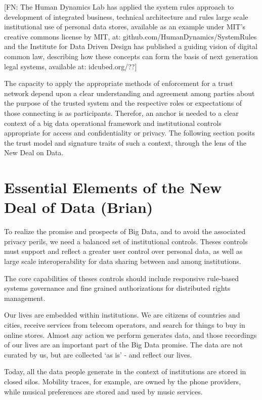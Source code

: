 [FN: The Human Dynamics Lab has applied the system rules approach to development of integrated business, technical architecture and rules large scale institutional use of personal data stores, available as an example under MIT's creative commons license by MIT, at: github.com/HumanDynamics/SystemRules and the Institute for Data Driven Design has published a guiding vision of digital common law, describing how these concepts can form the basis of next generation legal systems, available at: idcubed.org/??]

The capacity to apply the appropriate methods of enforcement for a trust network depend upon a clear understanding and agreement among parties about the purpose of the trusted system and the respective roles or expectations of those connecting is as participants.
Therefor, an anchor is needed to a clear context of a big data operational framework and institutional controls appropriate for access and confidentiality or privacy.
The following section posits the trust model and signature traits of such a context, through the lens of the New Deal on Data.

\section{Essential Elements of the New Deal of Data (Brian)}

To realize the promise and prospects of Big Data, and to avoid the associated privacy perils, we need a balanced set of institutional controls.
Theses controls must support and reflect a greater user control over personal data, as well as large scale interoperability for data sharing between and among institutions.

The core capabilities of theses controls should include responsive rule-based systems governance and fine grained authorizations for distributed rights management.

Our lives are embedded within institutions.
We are citizens of countries and cities, receive services from telecom operators, and search for things to buy in online stores.
Almost any action we perform generates data, and those recordings of our lives are an important part of the Big Data promise.
The data are not curated by us, but are collected `as is' - and reflect our lives.

Today, all the data people generate in the context of institutions are stored in closed silos. 
Mobility traces, for example, are owned by the phone providers, while musical preferences are stored and used by music services.

